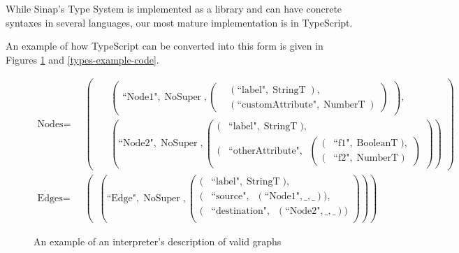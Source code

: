 \documentclass{article}
\DeclareMathOperator{\StringT}{StringT}
\DeclareMathOperator{\NumberT}{NumberT}
\DeclareMathOperator{\BooleanT}{BooleanT}
\DeclareMathOperator{\RecT}{RecT_\Gamma}
\DeclareMathOperator{\ObjT}{ObjT_\Gamma}
\DeclareMathOperator{\UnionT}{UnionT_\Gamma}
\DeclareMathOperator{\NoSuper}{NoSuper}
\begin{document}
While Sinap's Type System is implemented as a library and can have 
concrete syntaxes in several languages, our most mature implementation 
is in TypeScript. 

An example of how TypeScript can be converted into this form is given in 
Figures \ref{types-example} and \ref{types-example-code}. 

\begin{figure}
\begin{mdframed}
\begin{align*}
    \text{Nodes} = &\UnionT\left(
        \begin{aligned}
        &\ObjT\left(
            \begin{aligned}    
                \text{``Node1"}, \NoSuper, \left(
                    \begin{aligned}
                        &(\text{``label"}, \StringT),  \\
                        &(\text{``customAttribute"}, \NumberT)
                    \end{aligned}\right)
            \end{aligned}\right),  \\
        &\ObjT\left(\text{``Node2"}, \NoSuper, \left(\begin{aligned}
            (&\text{``label"}, \StringT),  \\
            (&\text{``otherAttribute"}, \RecT\left(
                \begin{aligned}
                    (&\text{``f1"}, \BooleanT),  \\
                    (&\text{``f2"}, \NumberT)
                \end{aligned}\right)
        \end{aligned}\right)\right)
        \end{aligned}\right)  \\
    \text{Edges} = &\UnionT\left(\ObjT\left(
        \text{``Edge"}, \NoSuper,  
        \left(\begin{aligned}
            (&\text{``label"}, \StringT), \\
            (&\text{``source"}, \ObjT(\text{``Node1"}, \_, \_)), \\
            (&\text{``destination"}, \ObjT(\text{``Node2"}, \_, \_)) \\             
        \end{aligned}\right)\right)\right)
\end{align*}
\end{mdframed}
\caption{An example of an interpreter's description of valid graphs}
\label{types-example}
\end{figure}
\end{document}
